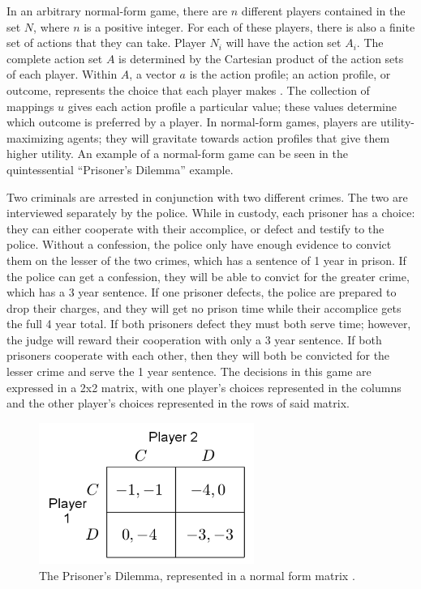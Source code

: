 In an arbitrary normal-form game, there are $n$ different players contained in the set $N$, where $n$ is a positive integer. For each of these players, there is also a finite set of actions that they can take. Player $N_i$ will have the action set $A_i$. The complete action set $A$ is determined by the Cartesian product of the action sets of each player. Within $A$, a vector $a$ is the action profile; an action profile, or outcome, represents the choice that each player makes \cite{osbo94}. The collection of mappings $u$ gives each action profile a particular value; these values determine which outcome is preferred by a player. In normal-form games, players are utility-maximizing agents; they will gravitate towards action profiles that give them higher utility. An example of a normal-form game can be seen in the quintessential ``Prisoner's Dilemma'' example.\\

\begin{exmp}
  Two criminals are arrested in conjunction with two different crimes. The two are interviewed separately by the police. While in custody, each prisoner has a choice: they can either cooperate with their accomplice, or defect and testify to the police. Without a confession, the police only have enough evidence to convict them on the lesser of the two crimes, which has a sentence of 1 year in prison. If the police can get a confession, they will be able to convict for the greater crime, which has a 3 year sentence. If one prisoner defects, the police are prepared to drop their charges, and they will get no prison time while their accomplice gets the full 4 year total. If both prisoners defect they must both serve time; however, the judge will reward their cooperation with only a 3 year sentence. If both prisoners cooperate with each other, then they will both be convicted for the lesser crime and serve the 1 year sentence. The decisions in this game are expressed in a 2x2 matrix, with one player's choices represented in the columns and the other player's choices represented in the rows of said matrix.

\begin{figure}[H]
  \centering
  \includegraphics[width=7cm]{figures/ExampleGrid.png}
  \caption{The Prisoner's Dilemma, represented in a normal form matrix \cite{shoh09}.}
  \label{fig:prisoner}
\end{figure}

\end{exmp}

